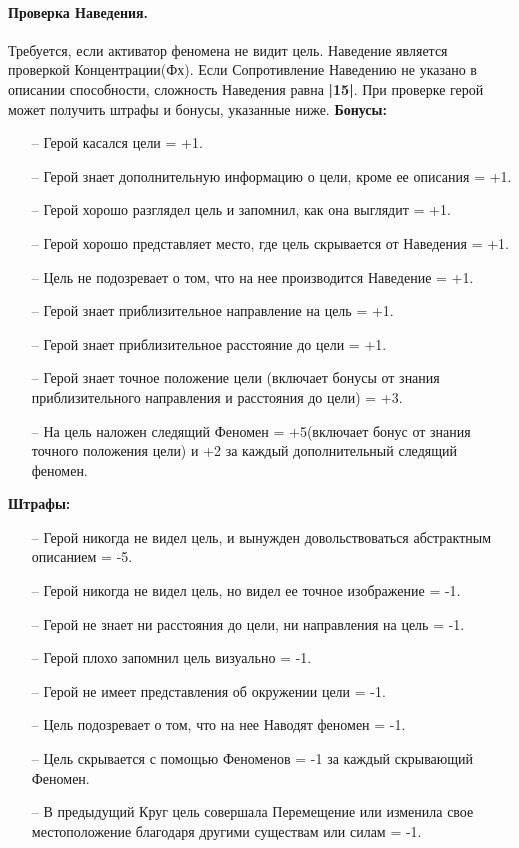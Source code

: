 \paragraph{Проверка Наведения.} Требуется, если активатор феномена не видит цель. Наведение является проверкой Концентрации(Фх). Если Сопротивление Наведению не указано в описании способности, сложность Наведения равна \textbf{|15|}. При проверке герой может получить штрафы и бонусы, указанные ниже.
\newline \textbf{Бонусы:}
\begin{itemize}
  \item[--] Герой касался цели = +1.
  \item[--] Герой знает дополнительную информацию о цели, кроме ее описания = +1.
  \item[--] Герой хорошо разглядел цель и запомнил, как она выглядит = +1.
  \item[--] Герой хорошо представляет место, где цель скрывается от Наведения = +1.
  \item[--] Цель не подозревает о том, что на нее производится Наведение = +1.
  \item[--] Герой знает приблизительное направление на цель = +1.
  \item[--] Герой знает приблизительное расстояние до цели = +1.
  \item[--] Герой знает точное положение цели (включает бонусы от знания приблизительного направления и расстояния до цели) = +3.
  \item[--] На цель наложен следящий Феномен = +5(включает бонус от знания точного положения цели) и +2 за каждый дополнительный следящий феномен.
\end{itemize}
\textbf{Штрафы:}
\begin{itemize}
  \item[--] Герой никогда не видел цель, и вынужден довольствоваться абстрактным описанием = -5.
  \item[--] Герой никогда не видел цель, но видел ее точное изображение = -1.
  \item[--] Герой не знает ни расстояния до цели, ни направления на цель = -1.
  \item[--] Герой плохо запомнил цель визуально = -1.
  \item[--] Герой не имеет представления об окружении цели = -1.
  \item[--] Цель подозревает о том, что на нее Наводят феномен = -1.
  \item[--] Цель скрывается с помощью Феноменов = -1 за каждый скрывающий Феномен.
  \item[--] В предыдущий Круг цель совершала Перемещение или изменила свое местоположение благодаря другими существам или силам = -1.
\end{itemize}


